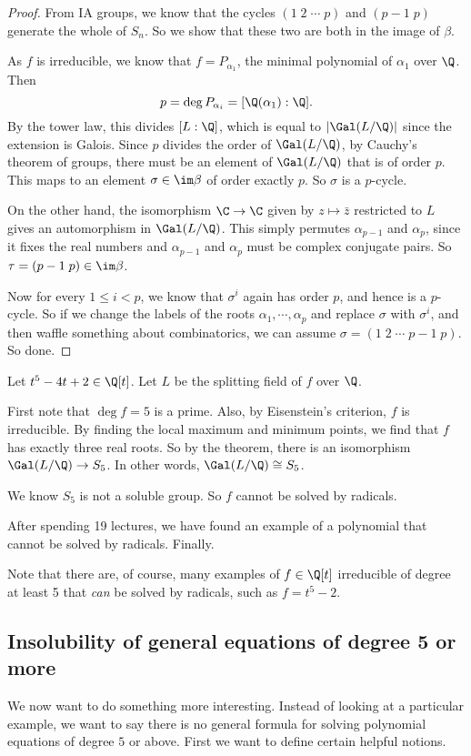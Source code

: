 \documentclass[a4paper]{article}
\begin{document}
\begin{proof}
  From IA groups, we know that the cycles $(1\; 2\; \cdots\; p)$ and $(p - 1\; p)$ generate the whole of $S_n$. So we show that these two are both in the image of $\beta$.

  As $f$ is irreducible, we know that $f = P_{\alpha_1}$, the minimal polynomial of $\alpha_1$ over $\Q$. Then
  \[
    p = \deg P_{\alpha_i} = [\Q(\alpha_1): \Q].
  \]
  By the tower law, this divides $[L:\Q]$, which is equal to $|\Gal(L/\Q)|$ since the extension is Galois. Since $p$ divides the order of $\Gal(L/\Q)$, by Cauchy's theorem of groups, there must be an element of $\Gal(L/\Q)$ that is of order $p$. This maps to an element $\sigma \in \im \beta$ of order exactly $p$. So $\sigma$ is a $p$-cycle.

  On the other hand, the isomorphism $\C \to \C$ given by $z \mapsto \bar{z}$ restricted to $L$ gives an automorphism in $\Gal(L/\Q)$. This simply permutes $\alpha_{p - 1}$ and $\alpha_p$, since it fixes the real numbers and $\alpha_{p - 1}$ and $\alpha_p$ must be complex conjugate pairs. So $\tau = (p - 1\; p) \in \im \beta$.

  Now for every $1 \leq i < p$, we know that $\sigma^i$ again has order $p$, and hence is a $p$-cycle. So if we change the labels of the roots $\alpha_1, \cdots, \alpha_p$ and replace $\sigma$ with $\sigma^i$, and then waffle something about combinatorics, we can assume $\sigma = (1\; 2\; \cdots \;p - 1\; p)$. So done.
\end{proof}

\begin{eg}
  Let $t^5 - 4t + 2 \in \Q[t]$. Let $L$ be the splitting field of $f$ over $\Q$.

  First note that $\deg f = 5$ is a prime. Also, by Eisenstein's criterion, $f$ is irreducible. By finding the local maximum and minimum points, we find that $f$ has exactly three real roots. So by the theorem, there is an isomorphism $\Gal(L/\Q) \to S_5$. In other words, $\Gal(L/\Q) \cong S_5$.

  We know $S_5$ is not a soluble group. So $f$ cannot be solved by radicals.
\end{eg}
After spending 19 lectures, we have found an example of a polynomial that cannot be solved by radicals. Finally.

Note that there are, of course, many examples of $f \in \Q[t]$ irreducible of degree at least 5 that \emph{can} be solved by radicals, such as $f = t^5 - 2$.

\subsection{Insolubility of general equations of degree 5 or more}
We now want to do something more interesting. Instead of looking at a particular example, we want to say there is no general formula for solving polynomial equations of degree $5$ or above. First we want to define certain helpful notions.
\end{document}
